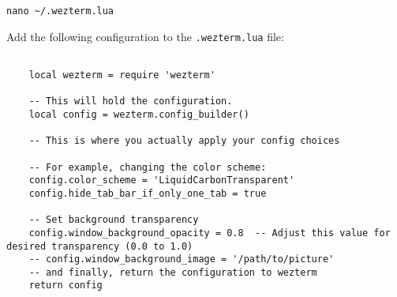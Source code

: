 \begin{lstlisting}
nano ~/.wezterm.lua
\end{lstlisting}


Add the following configuration to the \texttt{.wezterm.lua} file:

\begin{lstlisting}

    local wezterm = require 'wezterm'

    -- This will hold the configuration.
    local config = wezterm.config_builder()
    
    -- This is where you actually apply your config choices
    
    -- For example, changing the color scheme:
    config.color_scheme = 'LiquidCarbonTransparent'
    config.hide_tab_bar_if_only_one_tab = true
    
    -- Set background transparency
    config.window_background_opacity = 0.8  -- Adjust this value for desired transparency (0.0 to 1.0)
    -- config.window_background_image = '/path/to/picture'
    -- and finally, return the configuration to wezterm
    return config
    
\end{lstlisting}
